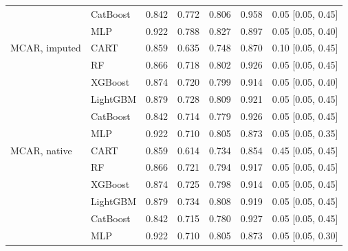 \documentclass[pdflatex,sn-mathphys]{sn-jnl}
\theoremstyle{thmstyleone}
\begin{document}
\begin{table}[htbp]
\begin{tabular}{@{}llrrrrl@{}}
 & CatBoost & 0.842 & 0.772 & 0.806 & 0.958 & 0.05 [0.05, 0.45] \\
 & MLP & 0.922 & 0.788 & 0.827 & 0.897 & 0.05 [0.05, 0.40] \\
\midrule
MCAR, imputed & CART & 0.859 & 0.635 & 0.748 & 0.870 & 0.10 [0.05, 0.45] \\
 & RF & 0.866 & 0.718 & 0.802 & 0.926 & 0.05 [0.05, 0.45] \\
 & XGBoost & 0.874 & 0.720 & 0.799 & 0.914 & 0.05 [0.05, 0.40] \\
 & LightGBM & 0.879 & 0.728 & 0.809 & 0.921 & 0.05 [0.05, 0.45] \\
 & CatBoost & 0.842 & 0.714 & 0.779 & 0.926 & 0.05 [0.05, 0.45] \\
 & MLP & 0.922 & 0.710 & 0.805 & 0.873 & 0.05 [0.05, 0.35] \\
\midrule
MCAR, native & CART & 0.859 & 0.614 & 0.734 & 0.854 & 0.45 [0.05, 0.45] \\
 & RF & 0.866 & 0.721 & 0.794 & 0.917 & 0.05 [0.05, 0.45] \\
 & XGBoost & 0.874 & 0.725 & 0.798 & 0.914 & 0.05 [0.05, 0.45] \\
 & LightGBM & 0.879 & 0.734 & 0.808 & 0.919 & 0.05 [0.05, 0.45] \\
 & CatBoost & 0.842 & 0.715 & 0.780 & 0.927 & 0.05 [0.05, 0.45] \\
 & MLP & 0.922 & 0.710 & 0.805 & 0.873 & 0.05 [0.05, 0.30] \\
\bottomrule
\end{tabular}
\end{table}
\end{document}
